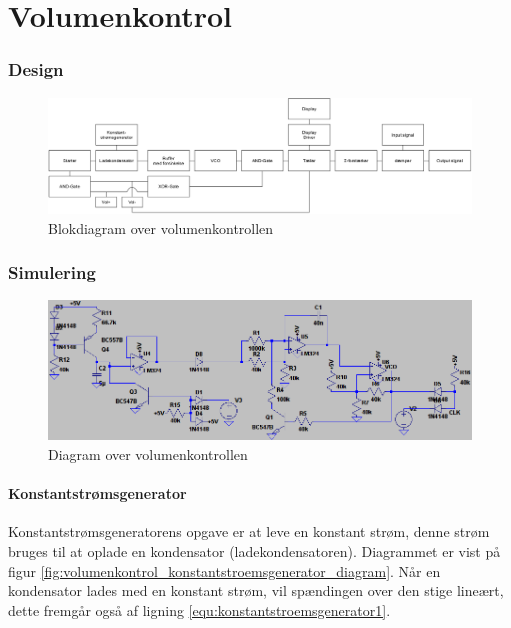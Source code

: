 \chapter{Volumenkontrol}
\label{volumenkontrol}

\subsection{Design}
\label{volumenkontrol-design}

\begin{figure}[h]
\centering
\includegraphics[width=\textwidth]{implementering/volumenkontrol/blokdiagram.png}
\caption{Blokdiagram over volumenkontrollen}
\label{fig:volumenkontrol_opbygning}
\end{figure}

\subsection{Simulering}
\label{volumenkontrol-simulering}

\begin{figure}[h]
\centering
\includegraphics[width=\textwidth]{implementering/volumenkontrol/diagram.png}
\caption{Diagram over volumenkontrollen}
\label{fig:volumenkontrol_diagram}
\end{figure}

\subsubsection{Konstantstrømsgenerator}
\label{volumenkontrol-simulering-konstantstroemsgenerator}

Konstantstrømsgeneratorens opgave er at leve en konstant strøm, denne strøm bruges til at oplade en kondensator (ladekondensatoren). Diagrammet er vist på figur \ref{fig:volumenkontrol_konstantstroemsgenerator_diagram}. Når en kondensator lades med en konstant strøm, vil spændingen over den stige lineært, dette fremgår også af ligning \ref{equ:konstantstroemsgenerator1}.

